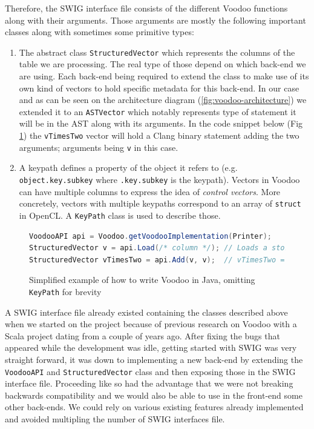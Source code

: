 Therefore, the SWIG interface file consists of the different Voodoo functions along with their arguments. Those arguments are mostly the following important classes along with sometimes some primitive types:

\begin{enumerate}
    \item The abstract class \texttt{StructuredVector} which represents the columns of the table we are processing. The real type of those depend on which back-end we are using. Each back-end being required to extend the class to make use of its own kind of vectors to hold specific metadata for this back-end. In our case and as can be seen on the architecture diagram (\ref{fig:voodoo-architecture}) we extended it to an \texttt{ASTVector} which notably represents type of statement it will be in the AST along with its arguments. In the code snippet below (Fig \ref{fig:java-voodoo-api}) the \texttt{vTimesTwo} vector will hold a Clang binary statement adding the two arguments; arguments being \texttt{v} in this case.
    
    \item A keypath defines a property of the object it refers to (e.g. \texttt{object.key.subkey} where \texttt{.key.subkey} is the keypath). Vectors in Voodoo can have multiple columns to express the idea of \emph{control vectors}. More concretely, vectors with multiple keypaths correspond to an array of \texttt{struct} in OpenCL. A \texttt{KeyPath} class is used to describe those.
\end{enumerate}

\begin{figure}[h]
    \centering
\begin{lstlisting}[frame=single, language=Java]  
VoodooAPI api = Voodoo.getVoodooImplementation(Printer);
StructuredVector v = api.Load(/* column */); // Loads a stored column of a table
StructuredVector vTimesTwo = api.Add(v, v);  // vTimesTwo = 2 * v
\end{lstlisting}
    \caption{Simplified example of how to write Voodoo in Java, omitting \texttt{KeyPath} for brevity}
    \label{fig:java-voodoo-api}
\end{figure}

A SWIG interface file already existed containing the classes described above when we started on the project because of previous research on Voodoo with a Scala project dating from a couple of years ago. After fixing the bugs that appeared while the development was idle, getting started with SWIG was very straight forward, it was down to implementing a new back-end by extending the \texttt{VoodooAPI} and \texttt{StructuredVector} class and then exposing those in the SWIG interface file. Proceeding like so had the advantage that we were not breaking backwards compatibility and we would also be able to use in the front-end some other back-ends. We could rely on various existing features already implemented and avoided multipling the number of SWIG interfaces file.

